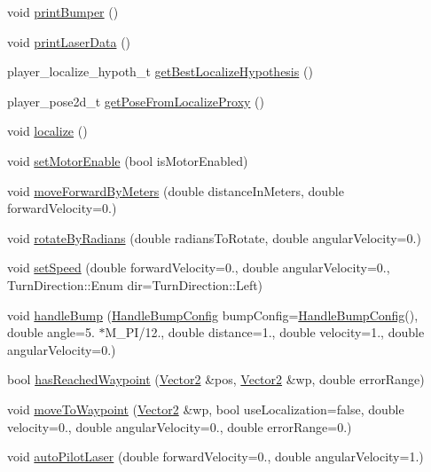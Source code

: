 \begin{DoxyCompactItemize}
void \hyperlink{classRobot_a04301aeae6bb441235a9020f2b214fbf}{print\+Bumper} ()
\item 
void \hyperlink{classRobot_a4117efa8d1191d33b76851e5b5b1b13d}{print\+Laser\+Data} ()
\item 
player\+\_\+localize\+\_\+hypoth\+\_\+t \hyperlink{classRobot_a7dc56a1fab3664a7384c062310a132d4}{get\+Best\+Localize\+Hypothesis} ()
\item 
player\+\_\+pose2d\+\_\+t \hyperlink{classRobot_ace17789169940f6780b0f21487adeb6b}{get\+Pose\+From\+Localize\+Proxy} ()
\item 
void \hyperlink{classRobot_ac81ff2dbb90696fa4e538888e3e6e0f2}{localize} ()
\item 
void \hyperlink{classRobot_ae59cdda4345c38cff6157f78a417b102}{set\+Motor\+Enable} (bool is\+Motor\+Enabled)
\item 
void \hyperlink{classRobot_a8cb45b5d6e8ede01ebe6996d7edcd093}{move\+Forward\+By\+Meters} (double distance\+In\+Meters, double forward\+Velocity=0.)
\item 
void \hyperlink{classRobot_a4e139756e0d56b718ff5c19daa7c5f57}{rotate\+By\+Radians} (double radians\+To\+Rotate, double angular\+Velocity=0.)
\item 
void \hyperlink{classRobot_a1135ca4f689f1d8354cb03c3a095934e}{set\+Speed} (double forward\+Velocity=0., double angular\+Velocity=0., Turn\+Direction\+::\+Enum dir=Turn\+Direction\+::\+Left)
\item 
void \hyperlink{classRobot_a306de5cd4eb51303215da0c297cad8f4}{handle\+Bump} (\hyperlink{structHandleBumpConfig}{Handle\+Bump\+Config} bump\+Config=\hyperlink{structHandleBumpConfig}{Handle\+Bump\+Config}(), double angle=5. $\ast$M\+\_\+\+PI/12., double distance=1., double velocity=1., double angular\+Velocity=0.)
\item 
bool \hyperlink{classRobot_a6d3148bac2584791cf1b6cf605b6141f}{has\+Reached\+Waypoint} (\hyperlink{structVector2}{Vector2} \&pos, \hyperlink{structVector2}{Vector2} \&wp, double error\+Range)
\item 
void \hyperlink{classRobot_aac3d5c4fe3ad380ad07be9ff0433efb3}{move\+To\+Waypoint} (\hyperlink{structVector2}{Vector2} \&wp, bool use\+Localization=false, double velocity=0., double angular\+Velocity=0., double error\+Range=0.)
\item 
void \hyperlink{classRobot_a265b1714581af33680485d17bb496526}{auto\+Pilot\+Laser} (double forward\+Velocity=0., double angular\+Velocity=1.)
\end{DoxyCompactItemize}
